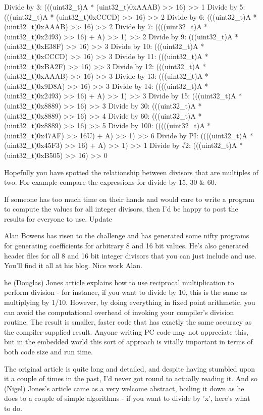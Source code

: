 {{{{{{{{{{Divide by 3: (((uint32_t)A * (uint32_t)0xAAAB) >> 16) >> 1
Divide by 5: (((uint32_t)A * (uint32_t)0xCCCD) >> 16) >> 2
Divide by 6: (((uint32_t)A * (uint32_t)0xAAAB) >> 16) >> 2
Divide by 7: ((((uint32_t)A * (uint32_t)0x2493) >> 16) + A) >> 1) >> 2
Divide by 9: (((uint32_t)A * (uint32_t)0xE38F) >> 16) >> 3
Divide by 10: (((uint32_t)A * (uint32_t)0xCCCD) >> 16) >> 3
Divide by 11: (((uint32_t)A * (uint32_t)0xBA2F) >> 16) >> 3
Divide by 12: (((uint32_t)A * (uint32_t)0xAAAB) >> 16) >> 3
Divide by 13: (((uint32_t)A * (uint32_t)0x9D8A) >> 16) >> 3
Divide by 14: ((((uint32_t)A * (uint32_t)0x2493) >> 16) + A) >> 1) >> 3
Divide by 15: (((uint32_t)A * (uint32_t)0x8889) >> 16) >> 3
Divide by 30: (((uint32_t)A * (uint32_t)0x8889) >> 16) >> 4
Divide by 60: (((uint32_t)A * (uint32_t)0x8889) >> 16) >> 5
Divide by 100: (((((uint32_t)A * (uint32_t)0x47AF) >> 16U) + A) >> 1) >> 6
Divide by PI: ((((uint32_t)A * (uint32_t)0x45F3) >> 16) + A) >> 1) >> 1
Divide by √2: (((uint32_t)A * (uint32_t)0xB505) >> 16) >> 0

Hopefully you have spotted the relationship between divisors that are multiples of two. For example compare the expressions for divide by 15, 30 & 60.

If someone has too much time on their hands and would care to write a program to compute the values for all integer divisors, then I’d be happy to post the results for everyone to use.
Update

Alan Bowens has risen to the challenge and has generated some nifty programs for generating coefficients for arbitrary 8 and 16 bit values. He’s also generated header files for all 8 and 16 bit integer divisors that you can just include and use. You’ll find it all at his blog. Nice work Alan.



he (Douglas) Jones article explains how to use reciprocal multiplication to perform division - for instance, if you want to divide by 10, this is the same as multiplying by 1/10. However, by doing everything in fixed point arithmetic, you can avoid the computational overhead of invoking your compiler's division routine. The result is smaller, faster code that has exactly the same accuracy as the compiler-supplied result. Anyone writing PC code may not appreciate this, but in the embedded world this sort of approach is vitally important in terms of both code size and run time.

The original article is quite long and detailed, and despite having stumbled upon it a couple of times in the past, I'd never got round to actually reading it. And so (Nigel) Jones's article came as a very welcome abstract, boiling it down as he does to a couple of simple algorithms - if you want to divide by 'x', here's what to do.

}}}}}}}}}}
